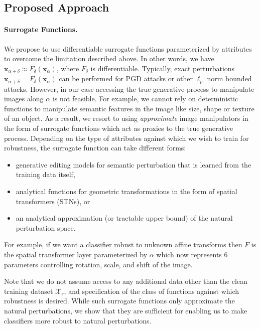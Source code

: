 \subsection{Proposed Approach}
\paragraph{Surrogate Functions.}
We propose to use differentiable surrogate functions parameterized by attributes to overcome the limitation described above. 
In other words, we have 
$\mathbf{x}_{\alpha+\delta} \approx F_{\delta}(\mathbf{x}_{\alpha})$, 
where $F_{\delta}$ is differentiable.
Typically, exact perturbations 
$\mathbf{x}_{\alpha+\delta} = F_{\delta}(\mathbf{x}_{\alpha})$
can be performed for PGD attacks or other $\ell_p$ norm bounded attacks.
However, in our case accessing the true generative process to manipulate images along $\alpha$ is not feasible. 
For example, we cannot rely on deterministic functions to manipulate semantic features in the image like size, shape or texture of an object.
As a result, we resort to using \emph{approximate} image manipulators in the form of surrogate functions which act as proxies to the true generative process.
Depending on the type of attributes against which we wish to train for robustness, the surrogate function can take different forms:
\begin{itemize}[nosep,noitemsep,leftmargin=2em]
    \item generative editing models for semantic perturbation that is learned from the training data itself,
    \item analytical functions for geometric transformations in the form of spatial transformers (STNs), or 
    \item an analytical approximation (or tractable upper bound) of the natural perturbation space.
\end{itemize}
For example, if we want a classifier robust to unknown affine transforms then $F$ is the spatial transformer layer parameterized by $\alpha$ which now represents $6$ parameters controlling rotation, scale, and shift of the image.




Note that we do not assume access to any additional data other than the clean training dataset $\mathcal{X}_s$, and specification of the class of functions against which robustness is desired. While such surrogate functions only approximate the natural perturbations, we show that they are sufficient for enabling us to make classifiers more robust to natural perturbations.




